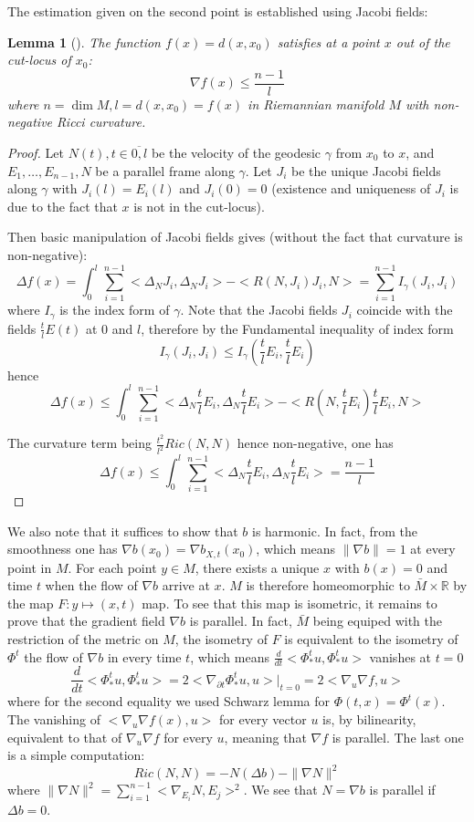 \documentclass[11pt]{article}
\newtheorem{lemma}[theorem]{Lemma}
\begin{document}
The estimation given on the second point is established using Jacobi fields:

\begin{lemma}[]
The function \(f(x) = d(x,x_0)\) satisfies at a point \(x\) out of the cut-locus of \(x_0\):
\[
\nabla f(x) \leq \frac{n-1}{l}
\]
where \(n=\dim M, l = d(x,x_0) = f(x)\) in Riemannian manifold \(M\) with non-negative Ricci curvature.
\end{lemma}

\begin{proof}
Let \(N(t), t\in\overline{0,l}\) be the velocity of the geodesic \(\gamma\) from \(x_0\) to \(x\), and
\(E_1,\dots, E_{n-1},N\) be a parallel frame along \(\gamma\). Let \(J_i\) be the unique Jacobi
fields along \(\gamma\) with \(J_i(l) = E_i(l)\) and \(J_i(0)=0\) (existence and uniqueness of \(J_i\) is
due to the fact that \(x\) is not in the cut-locus).

Then basic manipulation of Jacobi fields gives (without the fact that curvature is non-negative):
\[
\Delta f(x) = \int_0^l \sum_{i=1}^{n-1}<\Delta_N J_i, \Delta_N J_i> - < R(N,J_i)J_i,N > = \sum_{i=1}^{n-1} I_\gamma(J_i,J_i)
\]
where \(I_\gamma\) is the index form of \(\gamma\). Note that the Jacobi fields \(J_i\) coincide with the
fields \(\frac{t}{l}E(t)\) at \(0\) and \(l\), therefore by the Fundamental inequality of index form
\[
I_\gamma(J_i,J_i)\leq I_\gamma(\frac{t}{l}E_i,\frac{t}{l}E_i)
\]
hence
\[
\Delta f(x) \leq \int_0^l \sum_{i=1}^{n-1}<\Delta_N \frac{t}{l}E_i, \Delta_N \frac{t}{l}E_i> -
< R(N,\frac{t}{l}E_i)\frac{t}{l}E_i,N >
\]

The curvature term being \(\frac{t^2}{l^2}Ric(N,N)\) hence non-negative, one has
\[
\Delta f(x) \leq \int_0^l \sum_{i=1}^{n-1}<\Delta_N \frac{t}{l}E_i, \Delta_N \frac{t}{l}E_i> = \frac{n-1}{l}
\]
\end{proof}


We also note that it suffices to show that \(b\) is harmonic. In fact, from the smoothness one has
\(\nabla b(x_0) =\nabla b_{X,t}(x_0)\), which means \(\|\nabla b\| = 1\) at every point in \(M\). 
For each point \(y\in M\), there exists a unique \(x\) with \(b(x)=0\) and time \(t\) when the flow of
\(\nabla b\) arrive at \(x\). \(M\) is therefore homeomorphic to \(\bar M\times \mathbb{R}\) by the map
\(F: y\mapsto (x,t)\) map. To see that this map is isometric, it remains to prove that the gradient field
\(\nabla b\) is parallel. In fact, \(\bar M\) being equiped with the restriction of the metric on \(M\),
the isometry of \(F\) is equivalent to the isometry of \(\Phi^t\) the flow of \(\nabla b\) in every time
\(t\), which means \(\frac{d}{dt} <\Phi_*^t u, \Phi_*^t u>\) vanishes at \(t=0\)
\[
\frac{d}{dt}<\Phi_*^t u,\Phi_*^t u> = 2 <\nabla_{\partial t}\Phi_*^t u, u>|_{t=0} = 2<\nabla_u
\nabla f,u> 
\]
where for the second equality we used Schwarz lemma for \(\Phi(t,x) = \Phi^t(x)\). The vanishing of
\(<\nabla_u \nabla f(x),u>\) for every vector \(u\) is, by bilinearity, equivalent to that of \(\nabla_u
\nabla f\) for every \(u\), meaning that \(\nabla f\) is parallel. The last one is a simple computation:
\[
Ric(N,N) = -N(\Delta b) - \|\nabla N \|^2
\]
where \(\|\nabla N\|^2 = \sum_{i=1}^{n-1}<\nabla_{E_i}N, E_j>^2\). We see that \(N = \nabla b\) is parallel if \(\Delta b =0\).
\end{document}
